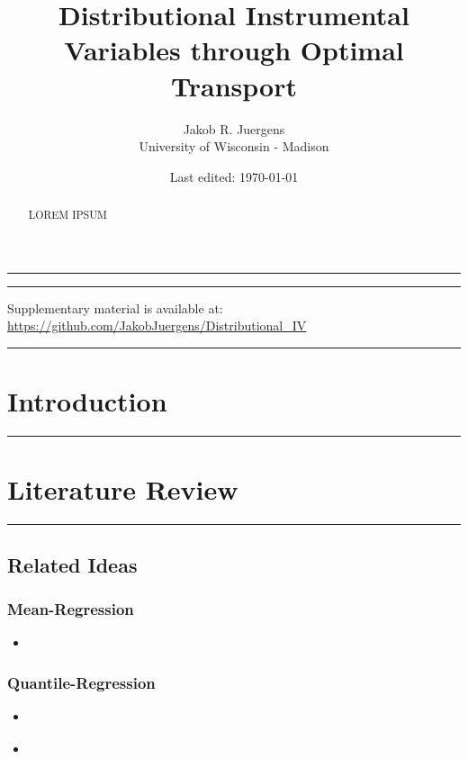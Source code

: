 \documentclass[letterpaper,10pt]{article}
\begin{document}
\singlespacing
\title{Distributional Instrumental Variables through Optimal Transport}
\date{Last edited: \today}
\author{Jakob R. Juergens \\ University of Wisconsin - Madison}
\maketitle
\hrule
\onehalfspacing
\begin{abstract}
    {\color{red} LOREM IPSUM}
\end{abstract}
\vspace{0.3cm}
\hrule
\singlespacing

\vspace{-0.3cm}
\begin{center}
    {\small Supplementary material is available at: \url{https://github.com/JakobJuergens/Distributional_IV}}
\end{center}
\vspace{0.3cm}
\hrule
\singlespacing
{\small \tableofcontents}
\thispagestyle{empty}


\newpage
\onehalfspacing
\section{Introduction}
\hrule

\section{Literature Review}
\hrule

\subsection*{Related Ideas}

\subsubsection*{Mean-Regression}
\begin{multicols}{2}
    \begin{itemize}
        \item \cite{hansen_econometrics_2022}
    \end{itemize}
\end{multicols}

\subsubsection*{Quantile-Regression}
\begin{multicols}{2}
    \begin{itemize}
        \item \cite{carlier_vector_2016}
        \item \cite{carlier_vector_2022}
    \end{itemize}
\end{multicols}
\end{document}
